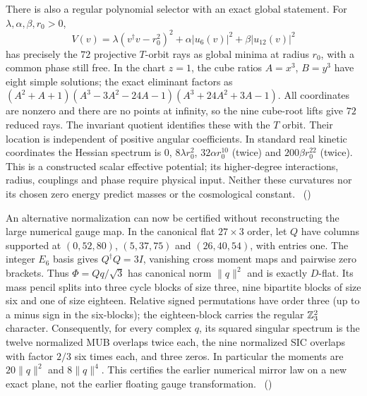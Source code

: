 There is also a regular polynomial selector with an exact global statement.
For $\lambda,\alpha,\beta,r_0>0$,
\[
 V(v)=\lambda(v^\dagger v-r_0^2)^2+\alpha|u_6(v)|^2+\beta|u_{12}(v)|^2
\]
has precisely the $72$ projective $T$-orbit rays as global minima at radius
$r_0$, with a common phase still free. In the chart $z=1$, the cube ratios
$A=x^3$, $B=y^3$ have eight simple solutions; the exact eliminant factors as
$(A^2+A+1)(A^3-3A^2-24A-1)(A^3+24A^2+3A-1)$.
All coordinates are nonzero and there are no points at infinity, so the nine
cube-root lifts give $72$ reduced rays. The invariant quotient identifies
these with the $T$ orbit. Their location is independent of positive angular
coefficients. In standard real kinetic coordinates the Hessian spectrum is
$0$, $8\lambda r_0^2$, $32\alpha r_0^{10}$ (twice) and
$200\beta r_0^{22}$ (twice). This is a constructed scalar effective potential;
its higher-degree interactions, radius, couplings and phase require physical
input. Neither these curvatures nor its chosen zero energy predict masses or
the cosmological constant.
\tierC\ ()

An alternative normalization can now be certified without reconstructing the
large numerical gauge map. In the canonical flat $27\times3$ order, let $Q$
have columns supported at $(0,52,80)$, $(5,37,75)$ and $(26,40,54)$, with entries
one. The integer $E_6$ basis gives $Q^\dagger Q=3I$, vanishing cross moment
maps and pairwise zero brackets. Thus $\Phi=Qq/\sqrt3$ has canonical norm
$\|q\|^2$ and is exactly $D$-flat. Its mass pencil splits into three cycle
blocks of size three, nine bipartite blocks of size six and one of size eighteen.
Relative signed permutations have order three (up to a minus sign in the
six-blocks); the eighteen-block carries the regular $\mathbb{Z}_3^2$ character.
Consequently, for every complex $q$, its squared singular spectrum is the
twelve normalized MUB overlaps twice each, the nine normalized SIC overlaps
with factor $2/3$ six times each, and three zeros. In particular the moments
are $20\|q\|^2$ and $8\|q\|^4$. This certifies the earlier numerical mirror
law on a new exact plane, not the earlier floating gauge transformation.
\tierC\ ()

